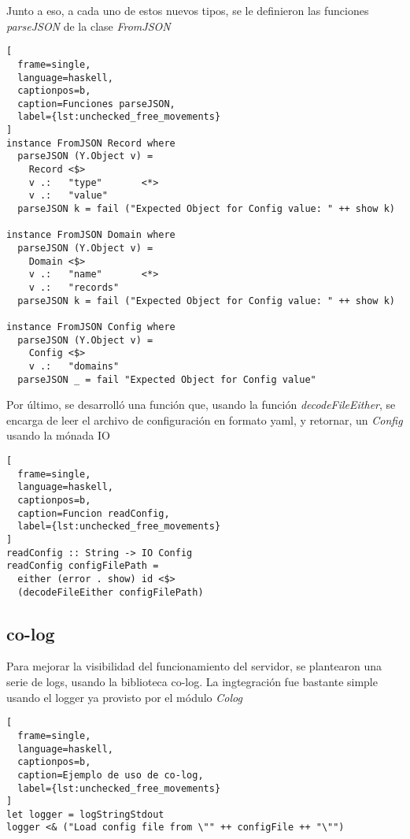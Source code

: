 \documentclass[6pt]{article}
\begin{document}
Junto a eso, a cada uno de estos nuevos tipos, se le definieron
las funciones \textit{parseJSON} de la clase \textit{FromJSON}

\clearpage
\begin{lstlisting}[
  frame=single,
  language=haskell,
  captionpos=b,
  caption=Funciones parseJSON,
  label={lst:unchecked_free_movements}
]
instance FromJSON Record where
  parseJSON (Y.Object v) =
    Record <$>
    v .:   "type"       <*>
    v .:   "value"
  parseJSON k = fail ("Expected Object for Config value: " ++ show k)

instance FromJSON Domain where
  parseJSON (Y.Object v) =
    Domain <$>
    v .:   "name"       <*>
    v .:   "records"
  parseJSON k = fail ("Expected Object for Config value: " ++ show k)

instance FromJSON Config where
  parseJSON (Y.Object v) =
    Config <$>
    v .:   "domains"
  parseJSON _ = fail "Expected Object for Config value"
\end{lstlisting}

Por último, se desarrolló una función que, usando la función
\textit{decodeFileEither}, se encarga de leer el archivo de configuración
en formato yaml, y retornar, un \textit{Config} usando la mónada IO

\begin{lstlisting}[
  frame=single,
  language=haskell,
  captionpos=b,
  caption=Funcion readConfig,
  label={lst:unchecked_free_movements}
]
readConfig :: String -> IO Config
readConfig configFilePath =
  either (error . show) id <$>
  (decodeFileEither configFilePath)
\end{lstlisting}

\subsection{co-log \cite{package-co-log}}

Para mejorar la visibilidad del funcionamiento del servidor, se
plantearon una serie de logs, usando la biblioteca co-log. La
ingtegración fue bastante simple usando el logger ya provisto
por el módulo \textit{Colog}

\begin{lstlisting}[
  frame=single,
  language=haskell,
  captionpos=b,
  caption=Ejemplo de uso de co-log,
  label={lst:unchecked_free_movements}
]
let logger = logStringStdout
logger <& ("Load config file from \"" ++ configFile ++ "\"")
\end{lstlisting}
\end{document}
